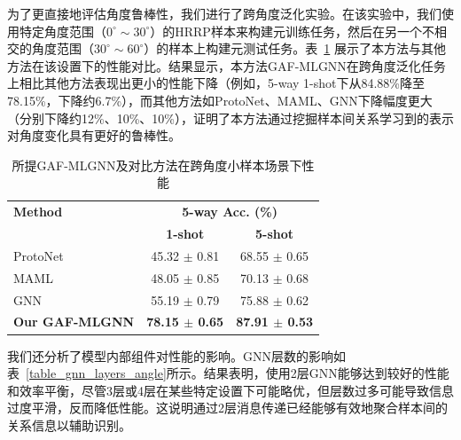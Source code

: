 为了更直接地评估角度鲁棒性，我们进行了跨角度泛化实验。在该实验中，我们使用特定角度范围（$0^\circ \sim 30^\circ$）的HRRP样本来构建元训练任务，然后在另一个不相交的角度范围（$30^\circ \sim 60^\circ$）的样本上构建元测试任务。表~\ref{tab:cross_angle} 展示了本方法与其他方法在该设置下的性能对比。结果显示，本方法GAF-MLGNN在跨角度泛化任务上相比其他方法表现出更小的性能下降（例如，5-way 1-shot下从84.88\%降至78.15\%，下降约6.7\%），而其他方法如ProtoNet、MAML、GNN下降幅度更大（分别下降约12\%、10\%、10\%），证明了本方法通过挖掘样本间关系学习到的表示对角度变化具有更好的鲁棒性。

\begin{table}[h!]
\centering
\caption{所提GAF-MLGNN及对比方法在跨角度小样本场景下性能}
\begin{tabular}{lcc}
\toprule
\multirow{2.5}{*}{\textbf{Method}} & \multicolumn{2}{c}{\textbf{5-way Acc. (\%)}} \\
\cmidrule(lr){2-3}
& \textbf{1-shot} & \textbf{5-shot} \\
\midrule
ProtoNet~\cite{snell_prototypical_2017} & 45.32 
$\pm$
 0.81 & 68.55 
$\pm$
 0.65 \\ %
MAML~\cite{finn_model-agnostic_2017}   & 48.05 
$\pm$
 0.85 & 70.13 
$\pm$
 0.68 \\ %
GNN~\cite{garcia_gnn_2018}      & 55.19 
$\pm$
 0.79 & 75.88 
$\pm$
 0.62 \\ %
\textbf{Our GAF-MLGNN}           & \textbf{78.15 
$\pm$
 0.65} & \textbf{87.91 
$\pm$
 0.53} \\ %
\bottomrule
\end{tabular}
\label{tab:cross_angle}
\end{table}

我们还分析了模型内部组件对性能的影响。GNN层数的影响如表~\ref{table_gnn_layers_angle}所示。结果表明，使用2层GNN能够达到较好的性能和效率平衡，尽管3层或4层在某些特定设置下可能略优，但层数过多可能导致信息过度平滑，反而降低性能。这说明通过2层消息传递已经能够有效地聚合样本间的关系信息以辅助识别。

